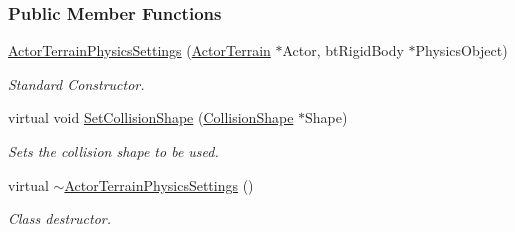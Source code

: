 \subsubsection*{Public Member Functions}
\begin{DoxyCompactItemize}
\item 
\hyperlink{classMezzanine_1_1ActorTerrainPhysicsSettings_ae7094b388ba2ac846aa269d6e35becda}{ActorTerrainPhysicsSettings} (\hyperlink{classMezzanine_1_1ActorTerrain}{ActorTerrain} $\ast$Actor, btRigidBody $\ast$PhysicsObject)
\begin{DoxyCompactList}\small\item\em Standard Constructor. \item\end{DoxyCompactList}\item 
virtual void \hyperlink{classMezzanine_1_1ActorTerrainPhysicsSettings_a0011fda184ee1e71ff9a2a5899eb10d2}{SetCollisionShape} (\hyperlink{classMezzanine_1_1CollisionShape}{CollisionShape} $\ast$Shape)
\begin{DoxyCompactList}\small\item\em Sets the collision shape to be used. \item\end{DoxyCompactList}\item 
\hypertarget{classMezzanine_1_1ActorTerrainPhysicsSettings_a949b7ccf0866adbdb396a68ef4e7b551}{
virtual \hyperlink{classMezzanine_1_1ActorTerrainPhysicsSettings_a949b7ccf0866adbdb396a68ef4e7b551}{$\sim$ActorTerrainPhysicsSettings} ()}
\label{classMezzanine_1_1ActorTerrainPhysicsSettings_a949b7ccf0866adbdb396a68ef4e7b551}

\begin{DoxyCompactList}\small\item\em Class destructor. \item\end{DoxyCompactList}\end{DoxyCompactItemize}

